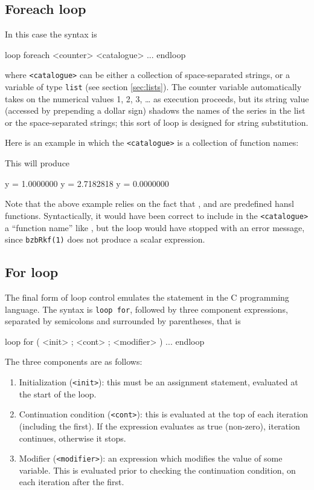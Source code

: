 \subsection{Foreach loop}
\label{sec:loop-foreach}

In this case the syntax is
\begin{code}
loop foreach <counter> <catalogue>
   ...
endloop
\end{code}
where \texttt{<catalogue>} can be either a collection of
space-separated strings, or a variable of type \texttt{list} (see
section \ref{sec:lists}). The counter variable automatically takes on
the numerical values 1, 2, 3, \dots{} as execution proceeds, but its
string value (accessed by prepending a dollar sign) shadows the names
of the series in the list or the space-separated strings; this sort of
loop is designed for string substitution.

Here is an example in which the \texttt{<catalogue>} is a collection
of function names: 
This will produce
\begin{code}
              y =  1.0000000
              y =  2.7182818
              y =  0.0000000
\end{code}
Note that the above example relies on the fact that ,
 and  are predefined hansl functions. Syntactically,
it would have been correct to include in the \texttt{<catalogue>} a
``function name'' like , but the loop would have stopped
with an error message, since \texttt{bzbRkf(1)} does not produce a
scalar expression.

\subsection{For loop}

The final form of loop control emulates the  statement in the
C programming language.  The syntax is \texttt{loop for}, followed by
three component expressions, separated by semicolons and surrounded by
parentheses, that is
\begin{code}
loop for ( <init> ; <cont> ; <modifier> )
   ...
endloop
\end{code}

The three components are as follows:
\begin{enumerate}
\item Initialization (\texttt{<init>}): this must be an assignment
  statement, evaluated at the start of the loop.
\item Continuation condition (\texttt{<cont>}): this is evaluated at
  the top of each iteration (including the first).  If the expression
  evaluates as true (non-zero), iteration continues, otherwise it
  stops. 
\item Modifier (\texttt{<modifier>}): an expression which modifies the
  value of some variable.  This is evaluated prior to checking the
  continuation condition, on each iteration after the first.
\end{enumerate}

